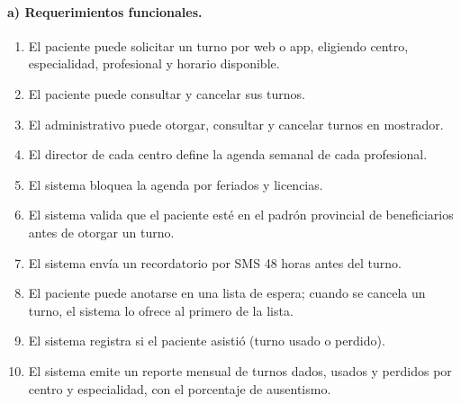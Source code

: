 \documentclass[11pt,a4paper]{article}
\begin{document}
\paragraph{a) Requerimientos funcionales.}
\begin{enumerate}[label=F\arabic*]
  \item El paciente puede solicitar un turno por web o app, eligiendo centro, especialidad, profesional y horario disponible.
  \item El paciente puede consultar y cancelar sus turnos.
  \item El administrativo puede otorgar, consultar y cancelar turnos en mostrador.
  \item El director de cada centro define la agenda semanal de cada profesional.
  \item El sistema bloquea la agenda por feriados y licencias.
  \item El sistema valida que el paciente esté en el padrón provincial de beneficiarios antes de otorgar un turno.
  \item El sistema envía un recordatorio por SMS 48 horas antes del turno.
  \item El paciente puede anotarse en una lista de espera; cuando se cancela un turno, el sistema lo ofrece al
  primero de la lista.
  \item El sistema registra si el paciente asistió (turno usado o perdido).
  \item El sistema emite un reporte mensual de turnos dados, usados y perdidos por centro y especialidad, con el
  porcentaje de ausentismo.
\end{enumerate}
\end{document}
